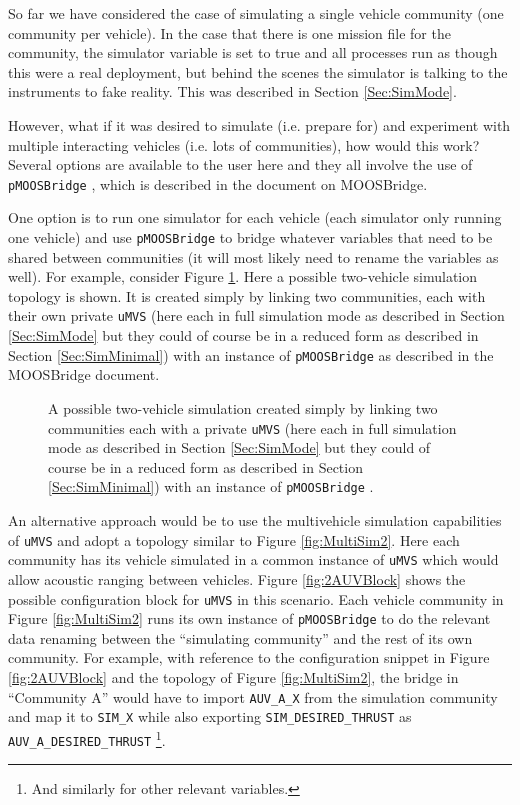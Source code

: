 \documentclass[a4paper,10pt]{article}
\newcommand{\Code}[1]{\texttt{#1} }
\newcommand{\code}[1]{\Code{#1} }
\begin{document}
So far we have considered the case of simulating a single vehicle
community (one community per vehicle). In the case that there is one
mission file for the community, the simulator variable is set to
true and all processes run as though this were a real deployment,
but behind the scenes the simulator is talking to the instruments
to fake reality. This was described in Section \ref{Sec:SimMode}.

However, what if it was desired to simulate (i.e. prepare for) and
experiment with multiple interacting vehicles (i.e. lots of
communities), how would this work? Several options are available to
the user here and they all involve the use of \code{pMOOSBridge},
which is described in the document on MOOSBridge.

One option is to run one simulator for each vehicle (each
simulator only running one vehicle) and use \code{pMOOSBridge} to
bridge whatever variables that need to be shared between
communities (it will most likely need to rename the variables
as well). For example, consider Figure \ref{fig:MultiSim1}. Here a
possible two-vehicle simulation topology is shown. It is created
simply by linking two communities, each with their own private
\code{uMVS} (here each in full simulation mode as described in
Section \ref{Sec:SimMode} but they could of course be in a reduced
form as described in Section \ref{Sec:SimMinimal}) with an
instance of \code{pMOOSBridge} as described in the MOOSBridge document.

\begin{figure}[ht]
\centering {}
\caption{A possible two-vehicle simulation created simply by
linking two communities each with a private \code{uMVS}(here each
in full simulation mode as described in Section \ref{Sec:SimMode}
but they could of course be in a reduced form as described in
Section \ref{Sec:SimMinimal}) with an instance of
\code{pMOOSBridge}.
 }\label{fig:MultiSim1}
\end{figure}


An alternative  approach would be to use the multivehicle
simulation capabilities of \code{uMVS} and adopt a topology
similar to Figure \ref{fig:MultiSim2}. Here each community has its
vehicle simulated in a common instance of \code{uMVS} which would
allow acoustic ranging between vehicles. Figure
\ref{fig:2AUVBlock} shows the possible configuration block for
\code{uMVS} in this scenario. Each vehicle community in Figure
\ref{fig:MultiSim2} runs its own instance of \code{pMOOSBridge} to
do the relevant data renaming between the ``simulating community''
and the rest of its own community. For example, with reference to
the configuration snippet in Figure \ref{fig:2AUVBlock} and the
topology of Figure \ref{fig:MultiSim2}, the bridge in ``Community
A'' would have to import \code{AUV\_A\_X} from the simulation
community and map it to \code{SIM\_X} while also exporting
\code{SIM\_DESIRED\_THRUST} as \code{AUV\_A\_DESIRED\_THRUST}
\footnote{And similarly for other relevant variables.}.
\end{document}
